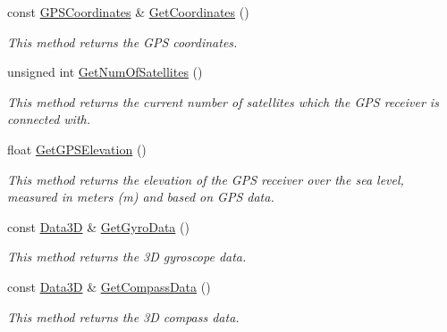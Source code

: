 \begin{DoxyCompactItemize}
const \hyperlink{structGPSCoordinates}{G\+P\+S\+Coordinates} \& \hyperlink{classGPSInterface_a21b7fb470d3e3641f9456a249e7df492}{Get\+Coordinates} ()
\begin{DoxyCompactList}\small\item\em This method returns the G\+PS coordinates. \end{DoxyCompactList}\item 
\mbox{\label{classGPSInterface_acfacca3208f482716bf3408f9ba04aff}} 
unsigned int \hyperlink{classGPSInterface_acfacca3208f482716bf3408f9ba04aff}{Get\+Num\+Of\+Satellites} ()
\begin{DoxyCompactList}\small\item\em This method returns the current number of satellites which the G\+PS receiver is connected with. \end{DoxyCompactList}\item 
\mbox{\label{classGPSInterface_a8c71f18097c6486574ae1e5ef84aeb4e}} 
float \hyperlink{classGPSInterface_a8c71f18097c6486574ae1e5ef84aeb4e}{Get\+G\+P\+S\+Elevation} ()
\begin{DoxyCompactList}\small\item\em This method returns the elevation of the G\+PS receiver over the sea level, measured in meters (m) and based on G\+PS data. \end{DoxyCompactList}\item 
\mbox{\label{classGPSInterface_a808e10398c33792afd17a0868bc37a31}} 
const \hyperlink{structData3D}{Data3D} \& \hyperlink{classGPSInterface_a808e10398c33792afd17a0868bc37a31}{Get\+Gyro\+Data} ()
\begin{DoxyCompactList}\small\item\em This method returns the 3D gyroscope data. \end{DoxyCompactList}\item 
\mbox{\label{classGPSInterface_a128eca920d581fafa3a497db0a385c31}} 
const \hyperlink{structData3D}{Data3D} \& \hyperlink{classGPSInterface_a128eca920d581fafa3a497db0a385c31}{Get\+Compass\+Data} ()
\begin{DoxyCompactList}\small\item\em This method returns the 3D compass data. \end{DoxyCompactList}\item 

\end{DoxyCompactItemize}
